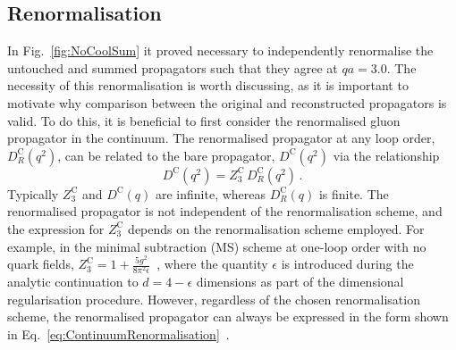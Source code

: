 \subsection{Renormalisation}\label{sec:Renormalisation}

In Fig.~\ref{fig:NoCoolSum} it proved necessary to independently renormalise the untouched and summed propagators such that they agree at $qa=3.0$. The necessity of this renormalisation is worth discussing, as it is important to motivate why comparison between the original and reconstructed propagators is valid. To do this, it is beneficial to first consider the renormalised gluon propagator in the continuum. The renormalised propagator at any loop order, $D_R^\text{C}(q^2)$, can be related to the bare propagator, $D^\text{C}(q^2)$ via the relationship
%
\begin{equation}
D^\text{C}(q^2) = Z^\text{C}_3 \, D_R^\text{C}(q^2)\, .
\label{eq:ContinuumRenormalisation}
\end{equation}
%
Typically $Z^\text{C}_3$ and $D^\text{C}(q)$ are infinite, whereas $D_R^\text{C}(q)$ is finite. The renormalised propagator is not independent of the renormalisation scheme, and the expression for $Z^\text{C}_3$ depends on the renormalisation scheme employed. For example, in the minimal subtraction (MS) scheme at one-loop order with no quark fields, $Z_3^\text{C}=1+\frac{5g^2}{8\pi^2\epsilon}$~\cite{ryder1996quantum}, where the quantity $\epsilon$ is introduced during the analytic continuation to $d = 4-\epsilon$ dimensions as part of the dimensional regularisation procedure. However, regardless of the chosen renormalisation scheme, the renormalised propagator can always be expressed in the form shown in Eq.~\eqref{eq:ContinuumRenormalisation}~\cite{vanRitbergen:1997va}.\\


